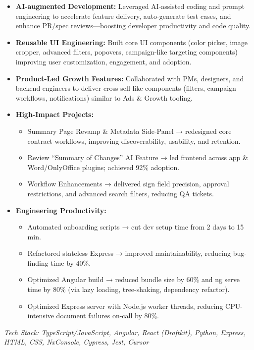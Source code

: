 \documentclass[a4paper,10pt]{article}
\begin{document}
\begin{itemize}
  \item \textbf{AI-augmented Development:} Leveraged AI-assisted coding and prompt engineering to accelerate feature delivery, auto-generate test cases, and enhance PR/spec reviews—boosting developer productivity and code quality.
  \item \textbf{Reusable UI Engineering:} Built core UI components (color picker, image cropper, advanced filters, popovers, campaign-like targeting components) improving user customization, engagement, and adoption.
  \item \textbf{Product-Led Growth Features:} Collaborated with PMs, designers, and backend engineers to deliver cross-sell-like components (filters, campaign workflows, notifications) similar to Ads \& Growth tooling.
  \item \textbf{High-Impact Projects:}
    \begin{itemize}
      \item Summary Page Revamp \& Metadata Side-Panel → redesigned core contract workflows, improving discoverability, usability, and retention.
      \item Review “Summary of Changes” AI Feature → led frontend across app \& Word/OnlyOffice plugins; achieved 92\% adoption.
      \item Workflow Enhancements → delivered sign field precision, approval restrictions, and advanced search filters, reducing QA tickets.
    \end{itemize}
  \item \textbf{Engineering Productivity:}
    \begin{itemize}
      \item Automated onboarding scripts → cut dev setup time from 2 days to 15 min.
      \item Refactored stateless Express → improved maintainability, reducing bug-finding time by 40\%.
      \item Optimized Angular build → reduced bundle size by 60\% and ng serve time by 80\% (via lazy loading, tree-shaking, dependency refactor).
      \item Optimized Express server with Node.js worker threads, reducing CPU-intensive document failures on-call by 80\%.
    \end{itemize}
\end{itemize}

\textit{Tech Stack: TypeScript/JavaScript, Angular, React (Draftkit), Python, Express, HTML, CSS, NxConsole, Cypress, Jest, Cursor}
\end{document}
